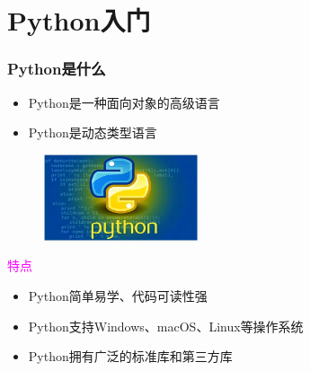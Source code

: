\small
\section{\rm{Python}入门}
\begin{frame}
	\frametitle{\textrm{Python}是什么}
	\begin{itemize}
		\item \textrm{Python}是一种面向对象的高级语言\\
			{\fontsize{7.2pt}{4.2pt}\selectfont{支持面向对象的风格或代码封装在对象的技术}}
		\item \textrm{Python}是动态类型语言\\
			{\fontsize{7.2pt}{4.2pt}\selectfont{变量类型在运行时确定，代码实现灵活}}
	\end{itemize}
\begin{figure}[h!]
\vspace*{-0.10in}
\centering
\includegraphics[height=1.0in, width=1.8in, viewport=0 0 602 339,clip]{Figures/python-experts.png}
\label{Python-experts}
\end{figure}
\textcolor{magenta}{特点}%
	\begin{itemize}
		\item \textrm{Python}简单易学、代码可读性强
		\item \textrm{Python}支持\textrm{Windows}、\textrm{macOS}、\textrm{Linux}等操作系统\\
			{\fontsize{7.2pt}{4.2pt}\selectfont{可以在不同的平台上无缝运行，而无需修改代码}}
		\item \textrm{Python}拥有广泛的标准库和第三方库
	\end{itemize}
\end{frame}

